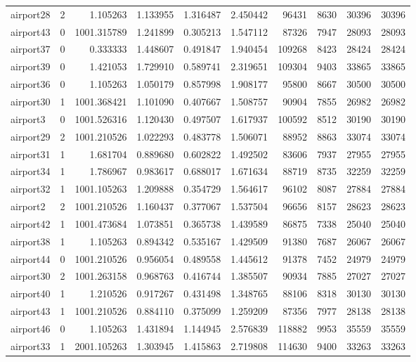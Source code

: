 \begin{longtable}{|l|r|r|r|r|r|r|r|r|r|}
airport28 & 2 & 1.105263 & 1.133955 & 1.316487 & 2.450442 & 96431 & 8630 & 30396 & 30396 \\
airport43 & 0 & 1001.315789 & 1.241899 & 0.305213 & 1.547112 & 87326 & 7947 & 28093 & 28093 \\
airport37 & 0 & 0.333333 & 1.448607 & 0.491847 & 1.940454 & 109268 & 8423 & 28424 & 28424 \\
airport39 & 0 & 1.421053 & 1.729910 & 0.589741 & 2.319651 & 109304 & 9403 & 33865 & 33865 \\
airport36 & 0 & 1.105263 & 1.050179 & 0.857998 & 1.908177 & 95800 & 8667 & 30500 & 30500 \\
airport30 & 1 & 1001.368421 & 1.101090 & 0.407667 & 1.508757 & 90904 & 7855 & 26982 & 26982 \\
airport3 & 0 & 1001.526316 & 1.120430 & 0.497507 & 1.617937 & 100592 & 8512 & 30190 & 30190 \\
airport29 & 2 & 1001.210526 & 1.022293 & 0.483778 & 1.506071 & 88952 & 8863 & 33074 & 33074 \\
airport31 & 1 & 1.681704 & 0.889680 & 0.602822 & 1.492502 & 83606 & 7937 & 27955 & 27955 \\
airport34 & 1 & 1.786967 & 0.983617 & 0.688017 & 1.671634 & 88719 & 8735 & 32259 & 32259 \\
airport32 & 1 & 1001.105263 & 1.209888 & 0.354729 & 1.564617 & 96102 & 8087 & 27884 & 27884 \\
airport2 & 2 & 1001.210526 & 1.160437 & 0.377067 & 1.537504 & 96656 & 8157 & 28623 & 28623 \\
airport42 & 1 & 1001.473684 & 1.073851 & 0.365738 & 1.439589 & 86875 & 7338 & 25040 & 25040 \\
airport38 & 1 & 1.105263 & 0.894342 & 0.535167 & 1.429509 & 91380 & 7687 & 26067 & 26067 \\
airport44 & 0 & 1001.210526 & 0.956054 & 0.489558 & 1.445612 & 91378 & 7452 & 24979 & 24979 \\
airport30 & 2 & 1001.263158 & 0.968763 & 0.416744 & 1.385507 & 90934 & 7885 & 27027 & 27027 \\
airport40 & 1 & 1.210526 & 0.917267 & 0.431498 & 1.348765 & 88106 & 8318 & 30130 & 30130 \\
airport43 & 1 & 1001.210526 & 0.884110 & 0.375099 & 1.259209 & 87356 & 7977 & 28138 & 28138 \\
airport46 & 0 & 1.105263 & 1.431894 & 1.144945 & 2.576839 & 118882 & 9953 & 35559 & 35559 \\
airport33 & 1 & 2001.105263 & 1.303945 & 1.415863 & 2.719808 & 114630 & 9400 & 33263 & 33263 \\

\end{longtable}
